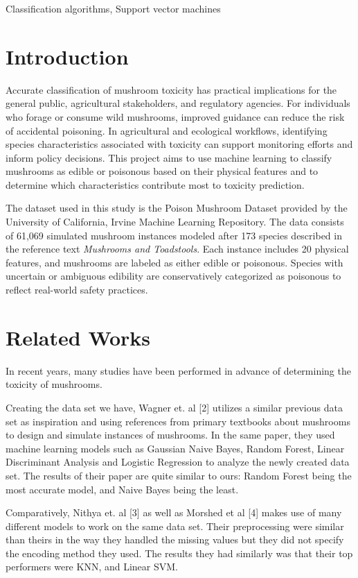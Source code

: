 \documentclass[conference]{IEEEtran}
\begin{document}
\begin{IEEEkeywords}
Classification algorithms, Support vector machines
\end{IEEEkeywords}

\section{Introduction}

Accurate classification of mushroom toxicity has practical implications for the general public, agricultural stakeholders, and regulatory agencies. For individuals who forage or consume wild mushrooms, improved guidance can reduce the risk of accidental poisoning. In agricultural and ecological workflows, identifying species characteristics associated with toxicity can support monitoring efforts and inform policy decisions. This project aims to use machine learning to classify mushrooms as edible or poisonous based on their physical features and to determine which characteristics contribute most to toxicity prediction.

The dataset used in this study is the Poison Mushroom Dataset provided by the University of California, Irvine Machine Learning Repository. The data consists of 61{,}069 simulated mushroom instances modeled after 173 species described in the reference text \emph{Mushrooms and Toadstools}. Each instance includes 20 physical features, and mushrooms are labeled as either edible or poisonous. Species with uncertain or ambiguous edibility are conservatively categorized as poisonous to reflect real-world safety practices.

\section{Related Works}
In recent years, many studies have been performed in advance of determining the toxicity of mushrooms.

Creating the data set we have, Wagner et. al [2] utilizes a similar previous data set as inspiration and using references from primary textbooks about mushrooms to design and simulate instances of mushrooms. In the same paper, they used machine learning models such as Gaussian Naive Bayes, Random Forest, Linear Discriminant Analysis and Logistic Regression to analyze the newly created data set. The results of their paper are quite similar to ours: Random Forest being the most accurate model, and Naive Bayes being the least. 

Comparatively, Nithya et. al [3] as well as Morshed et al [4] makes use of many different models to work on the same data set. Their preprocessing were similar than theirs in the way they handled the missing values but they did not specify the encoding method they used. The results they had similarly was that their top performers were KNN, and Linear SVM. 
\end{document}
